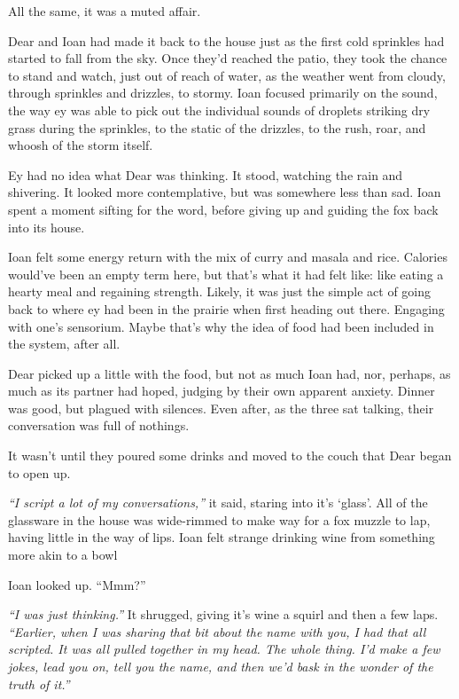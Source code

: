All the same, it was a muted affair.

Dear and Ioan had made it back to the house just as the first cold sprinkles had started to fall from the sky. Once they'd reached the patio, they took the chance to stand and watch, just out of reach of water, as the weather went from cloudy, through sprinkles and drizzles, to stormy. Ioan focused primarily on the sound, the way ey was able to pick out the individual sounds of droplets striking dry grass during the sprinkles, to the static of the drizzles, to the rush, roar, and whoosh of the storm itself.

Ey had no idea what Dear was thinking. It stood, watching the rain and shivering. It looked more contemplative, but was somewhere less than sad. Ioan spent a moment sifting for the word, before giving up and guiding the fox back into its house.

Ioan felt some energy return with the mix of curry and masala and rice. Calories would've been an empty term here, but that's what it had felt like: like eating a hearty meal and regaining strength. Likely, it was just the simple act of going back to where ey had been in the prairie when first heading out there. Engaging with one's sensorium. Maybe that's why the idea of food had been included in the system, after all.

Dear picked up a little with the food, but not as much Ioan had, nor, perhaps, as much as its partner had hoped, judging by their own apparent anxiety. Dinner was good, but plagued with silences. Even after, as the three sat talking, their conversation was full of nothings.

It wasn't until they poured some drinks and moved to the couch that Dear began to open up.

\emph{``I script a lot of my conversations,''} it said, staring into it's `glass'. All of the glassware in the house was wide-rimmed to make way for a fox muzzle to lap, having little in the way of lips. Ioan felt strange drinking wine from something more akin to a bowl

Ioan looked up. ``Mmm?''

\emph{``I was just thinking.''} It shrugged, giving it's wine a squirl and then a few laps. \emph{``Earlier, when I was sharing that bit about the name with you, I had that all scripted. It was all pulled together in my head. The whole thing. I'd make a few jokes, lead you on, tell you the name, and then we'd bask in the wonder of the truth of it.''}

